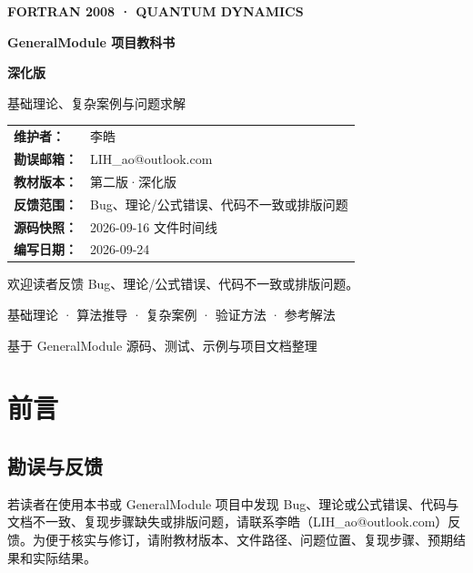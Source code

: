 \documentclass[UTF8,openany,11pt,fontset=fandol]{ctexbook}
\renewcommand{\arraystretch}{1.18}
\begin{document}
\begin{titlepage}
\centering
\vspace*{1.8cm}
{\Large\sffamily\bfseries\color{bookaccent} FORTRAN 2008 · QUANTUM DYNAMICS\par}
\vspace{1.0cm}
{\Huge\sffamily\bfseries GeneralModule 项目教科书\par}
\vspace{0.45cm}
{\LARGE\bfseries 深化版\par}
\vspace{0.45cm}
{\Large\color{black!70} 基础理论、复杂案例与问题求解\par}
\vspace{1.6cm}
\begin{minipage}{0.78\textwidth}
\renewcommand{\arraystretch}{1.5}
\begin{tabular}{@{}>{\bfseries}p{}p{}@{}}
维护者： & 李皓\\
勘误邮箱： & LIH\_ao@outlook.com\\
教材版本： & 第二版·深化版\\
反馈范围： & Bug、理论/公式错误、代码不一致或排版问题\\
源码快照： & 2026-09-16 文件时间线\\
编写日期： & 2026-09-24
\end{tabular}
\end{minipage}
\vspace{0.4cm}
{\small\color{bookgray}欢迎读者反馈 Bug、理论/公式错误、代码不一致或排版问题。\par}
\vfill
{\large\color{bookgray}基础理论 · 算法推导 · 复杂案例 · 验证方法 · 参考解法\par}
\vspace{0.4cm}
{\small\color{bookgray}基于 GeneralModule 源码、测试、示例与项目文档整理\par}
\end{titlepage}
\frontmatter
\chapter*{前言}

\section*{勘误与反馈}
若读者在使用本书或 GeneralModule 项目中发现 Bug、理论或公式错误、代码与文档不一致、复现步骤缺失或排版问题，请联系李皓（LIH\_ao@outlook.com）反馈。为便于核实与修订，请附教材版本、文件路径、问题位置、复现步骤、预期结果和实际结果。
\end{document}
